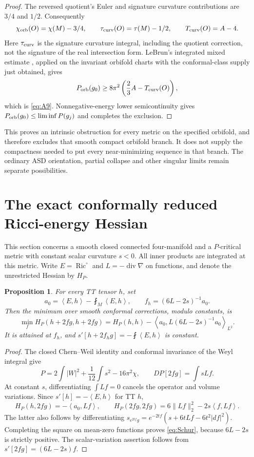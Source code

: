 \documentclass[11pt]{article}
\newtheorem{proposition}[theorem]{Proposition}
\DeclareMathOperator{\Ric}{Ric}
\newcommand{\ip}[2]{\left\langle #1,#2\right\rangle}
\begin{document}
\begin{proof}
The reversed quotient's Euler and signature curvature contributions are $3/4$ and $1/2$. Consequently
\[
 \chi_{\rm orb}(O)=\chi(M)-3/4,\qquad
 \tau_{\rm curv}(O)=\tau(M)-1/2,\qquad
 T_{\rm curv}(O)=A-4.
\]
Here $\tau_{\rm curv}$ is the signature curvature integral, including the quotient correction, not the signature of the real intersection form. LeBrun's integrated mixed estimate \cite{LeBrun}, applied on the invariant orbifold charts with the conformal-class supply just obtained, gives
\[
 P_{\rm orb}(g_0)\ge8\pi^2\left(\frac23A-T_{\rm curv}(O)\right),
\]
which is \eqref{eq:A9}. Nonnegative-energy lower semicontinuity gives $P_{\rm orb}(g_0)\le\liminf P(g_j)$ and completes the exclusion.
\end{proof}
This proves an intrinsic obstruction for every metric on the specified orbifold, and therefore excludes that smooth compact orbifold branch. It does not supply the compactness needed to put every near-minimizing sequence in that branch. The ordinary ASD orientation, partial collapse and other singular limits remain separate possibilities.

\section{The exact conformally reduced Ricci-energy Hessian}
This section concerns a smooth closed connected four-manifold and a $P$-critical metric with constant scalar curvature $s<0$. All inner products are integrated at this metric. Write $E=\Ric^\circ$ and $L=-\operatorname{div}\nabla$ on functions, and denote the unrestricted Hessian by $H_P$.

\begin{proposition}\label{prop:Schur}
For every TT tensor $h$, set
\[
 a_0=\ip{E}{h}-\fint_M\ip{E}{h},\qquad
 f_h=(6L-2s)^{-1}a_0.
\]
Then the minimum over smooth conformal corrections, modulo constants, is
\begin{equation}\label{eq:Schur}
 \min_f H_P(h+2fg,h+2fg)
 =H_P(h,h)-\ip{a_0}{L(6L-2s)^{-1}a_0}_{L^2}.
\end{equation}
It is attained at $f_h$, and $s'[h+2f_hg]=-\fint\ip{E}{h}$ is constant.
\end{proposition}

\begin{proof}
The closed Chern--Weil identity and conformal invariance of the Weyl integral give
\[
 P=2\int|W|^2+\frac1{12}\int s^2-16\pi^2\chi,
 \qquad DP[2fg]=\int sLf.
\]
At constant $s$, differentiating $\int Lf=0$ cancels the operator and volume variations. Since $s'[h]=-\ip{E}{h}$ for TT $h$,
\[
 H_P(h,2fg)=-\ip{a_0}{Lf},\qquad
 H_P(2fg,2fg)=6\|Lf\|_2^2-2s\ip{f}{Lf}.
\]
The latter also follows by differentiating
$s_{e^{2tf}g}=e^{-2tf}(s+6tLf-6t^2|df|^2)$.
Completing the square on mean-zero functions proves \eqref{eq:Schur}, because $6L-2s$ is strictly positive. The scalar-variation assertion follows from $s'[2fg]=(6L-2s)f$.
\end{proof}
\end{document}
